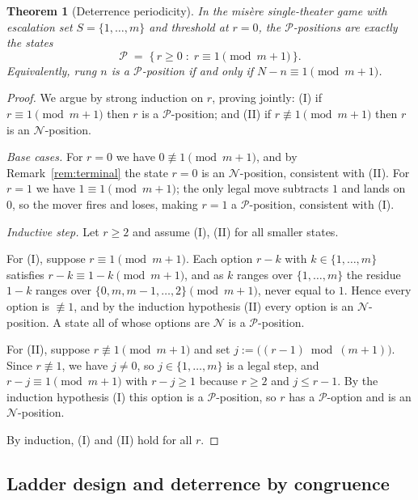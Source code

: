 \documentclass[11pt]{article}
\theoremstyle{plain}
\newtheorem{theorem}{Theorem}[section]
\theoremstyle{definition}
\theoremstyle{remark}
\begin{document}
\begin{theorem}[Deterrence periodicity]\label{thm:A}
In the mis\`ere single-theater game with escalation set $S=\{1,\dots,m\}$ and
threshold at $r=0$, the $\mathcal{P}$-positions are exactly the states
\[
  \mathcal{P} \;=\; \{\, r \ge 0 \;:\; r \equiv 1 \pmod{m+1} \,\}.
\]
Equivalently, rung $n$ is a $\mathcal{P}$-position if and only if
$N - n \equiv 1 \pmod{m+1}$.
\end{theorem}

\begin{proof}
We argue by strong induction on $r$, proving jointly:
(I) if $r \equiv 1 \pmod{m+1}$ then $r$ is a $\mathcal{P}$-position; and
(II) if $r \not\equiv 1 \pmod{m+1}$ then $r$ is an $\mathcal{N}$-position.

\emph{Base cases.} For $r=0$ we have $0\not\equiv 1\pmod{m+1}$, and by
Remark~\ref{rem:terminal} the state $r=0$ is an $\mathcal{N}$-position,
consistent with (II). For $r=1$ we have $1\equiv 1\pmod{m+1}$; the only legal
move subtracts $1$ and lands on $0$, so the mover fires and loses, making
$r=1$ a $\mathcal{P}$-position, consistent with (I).

\emph{Inductive step.} Let $r\ge 2$ and assume (I), (II) for all smaller
states.

For (I), suppose $r\equiv 1\pmod{m+1}$. Each option $r-k$ with
$k\in\{1,\dots,m\}$ satisfies $r-k\equiv 1-k\pmod{m+1}$, and as $k$ ranges
over $\{1,\dots,m\}$ the residue $1-k$ ranges over
$\{0,m,m-1,\dots,2\}\pmod{m+1}$, never equal to $1$. Hence every option is
$\not\equiv 1$, and by the induction hypothesis (II) every option is an
$\mathcal{N}$-position. A state all of whose options are $\mathcal{N}$ is a
$\mathcal{P}$-position.

For (II), suppose $r\not\equiv 1\pmod{m+1}$ and set
$j:=\big((r-1)\bmod(m+1)\big)$. Since $r\not\equiv 1$, we have $j\neq 0$, so
$j\in\{1,\dots,m\}$ is a legal step, and $r-j\equiv 1\pmod{m+1}$ with
$r-j\ge 1$ because $r\ge 2$ and $j\le r-1$. By the induction hypothesis (I)
this option is a $\mathcal{P}$-position, so $r$ has a $\mathcal{P}$-option
and is an $\mathcal{N}$-position.

By induction, (I) and (II) hold for all $r$.
\end{proof}

\subsection{Ladder design and deterrence by congruence}
\end{document}
